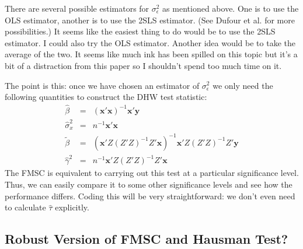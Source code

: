 \documentclass[12pt]{article}
\theoremstyle{definition}
\begin{document}
There are several possible estimators for $\sigma_\epsilon^2$ as mentioned above. One is to use the OLS estimator, another is to use the 2SLS estimator. (See Dufour et al. for more possibilities.) It seems like the easiest thing to do would be to use the 2SLS estimator. I could also try the OLS estimator. Another idea would be to take the average of the two. It seems like much ink has been spilled on this topic but it's a bit of a distraction from this paper so I shouldn't spend too much time on it.

The point is this: once we have chosen an estimator of $\sigma_\epsilon^2$ we only need the following quantities to construct the DHW test statistic:
  \begin{eqnarray*}
    \widehat{\beta} &=& (\mathbf{x}'\mathbf{x})^{-1}\mathbf{x}'\mathbf{y}\\
    \widehat{\sigma}_x^2 &=& n^{-1}\mathbf{x}'\mathbf{x} \\
    \widetilde{\beta} &=& (\mathbf{x}'Z(Z'Z)^{-1} Z'\mathbf{x})^{-1}\mathbf{x}'Z (Z'Z)^{-1} Z'\mathbf{y}\\
    \widehat{\gamma}^2 &=& n^{-1} \mathbf{x}'Z(Z'Z)^{-1}Z'\mathbf{x}
  \end{eqnarray*}
The FMSC is equivalent to carrying out this test at a particular significance level. Thus, we can easily compare it to some other significance levels and see how the performance differs. Coding this will be very straightforward: we don't even need to calculate $\widehat{\tau}$ explicitly. 


\subsection{Robust Version of FMSC and Hausman Test?} %
\label{sub:robust_version_of_fmsc_and_hausman_test_}
\end{document}
